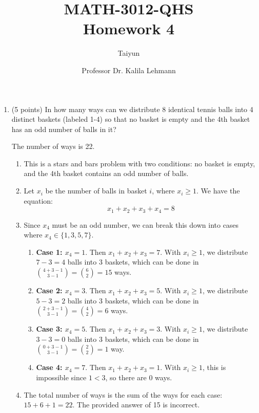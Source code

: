 \documentclass{article}
\author{Taiyun}
\title{MATH-3012-QHS \\ Homework 4}
\date{Professor Dr. Kalila Lehmann}
\begin{document}
\maketitle









\begin{enumerate}
  \item (5 points) In how many ways can we distribute 8 identical tennis balls 
  into 4 distinct baskets (labeled 1-4) so that no basket is empty and the 4th 
  basket has an odd number of balls in it?
  \begin{answer}
    The number of ways is 22.
    \begin{enumerate}
      \item This is a stars and bars problem with two conditions: no basket 
      is empty, and the 4th basket contains an odd number of balls.
      \item Let $x_i$ be the number of balls in basket $i$, where $x_i \geq 1$. 
      We have the equation:
      $$
      x_1 + x_2 + x_3 + x_4 = 8
      $$
      \item Since $x_4$ must be an odd number, we can break this down into 
      cases where $x_4 \in \{1, 3, 5, 7\}$.
      \begin{enumerate}
        \item \textbf{Case 1: $x_4 = 1$}. Then $x_1+x_2+x_3=7$. With $x_i \geq 1$, 
        we distribute $7-3=4$ balls into 3 baskets, which can be done in $\binom{4+3-1}{3-1} = \binom{6}{2} = 15$ ways.
        \item \textbf{Case 2: $x_4 = 3$}. Then $x_1+x_2+x_3=5$. With $x_i \geq 1$, 
        we distribute $5-3=2$ balls into 3 baskets, which can be done in $\binom{2+3-1}{3-1} = \binom{4}{2} = 6$ ways.
        \item \textbf{Case 3: $x_4 = 5$}. Then $x_1+x_2+x_3=3$. With $x_i \geq 1$, 
        we distribute $3-3=0$ balls into 3 baskets, which can be done in $\binom{0+3-1}{3-1} = \binom{2}{2} = 1$ way.
        \item \textbf{Case 4: $x_4 = 7$}. Then $x_1+x_2+x_3=1$. With $x_i \geq 1$, 
        this is impossible since $1 < 3$, so there are 0 ways.
      \end{enumerate}
      \item The total number of ways is the sum of the ways for each case: $15 + 6 + 1 = 22$. The provided answer of 15 is incorrect.
    \end{enumerate}
  \end{answer}



\end{enumerate}
\end{document}
